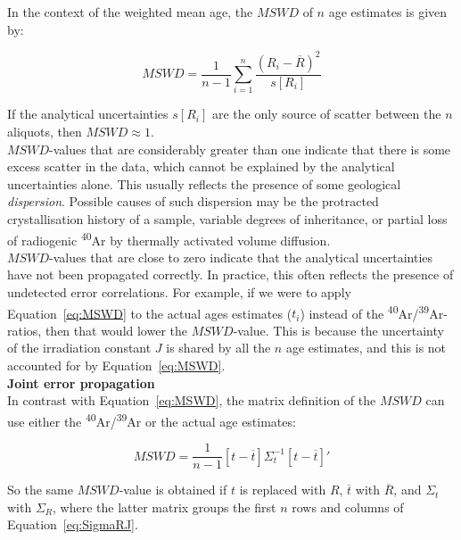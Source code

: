 \documentclass{article}
\begin{document}
In the context of the weighted mean age, the $MSWD$ of $n$ age
estimates is given by:

\begin{equation}
  MSWD = \frac{1}{n-1} \sum_{i=1}^{n} \frac{(R_i-\overline{R})^2}{s[R_i]}
  \label{eq:MSWD}
\end{equation}

If the analytical uncertainties $s[R_i]$ are the only source of
scatter between the $n$ aliquots, then $MSWD \approx 1$.\\

$MSWD$-values that are considerably greater than one indicate that
there is some excess scatter in the data, which cannot be explained by
the analytical uncertainties alone. This usually reflects the presence
of some geological \emph{dispersion}. Possible causes of such
dispersion may be the protracted crystallisation history of a sample,
variable degrees of inheritance, or partial loss of radiogenic
\textsuperscript{40}Ar by thermally activated volume diffusion.\\

$MSWD$-values that are close to zero indicate that the analytical
uncertainties have not been propagated correctly. In practice, this
often reflects the presence of undetected error correlations. For
example, if we were to apply Equation~\ref{eq:MSWD} to the actual ages
estimates ($t_i$) instead of the
\textsuperscript{40}Ar/\textsuperscript{39}Ar-ratios, then that would
lower the $MSWD$-value. This is because the uncertainty of the
irradiation constant $J$ is shared by all the $n$ age estimates, and
this is not accounted for by Equation~\ref{eq:MSWD}.\\

\noindent\textbf{Joint error propagation}\\

In contrast with Equation~\ref{eq:MSWD}, the matrix definition of the
$MSWD$ can use either the
\textsuperscript{40}Ar/\textsuperscript{39}Ar or the actual age
estimates:

\begin{equation}
  MSWD = \frac{1}{n-1}[t - \overline{t}] \Sigma_t^{-1} [t - \overline{t}]'
  \label{eq:MSWD2}
\end{equation}

So the same $MSWD$-value is obtained if $t$ is replaced with $R$,
$\overline{t}$ with $\overline{R}$, and $\Sigma_t$ with $\Sigma_R$,
where the latter matrix groups the first $n$ rows and columns of
Equation~\ref{eq:SigmaRJ}.
\end{document}
